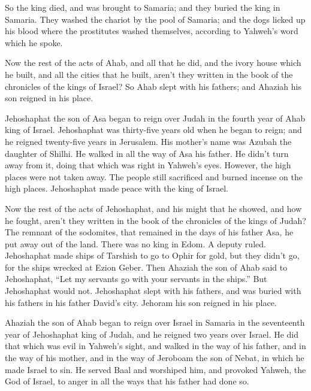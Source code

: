  So the king died, and was brought to Samaria; and they
buried the king in Samaria.  They washed the chariot by
the pool of Samaria; and the dogs licked up his blood where the
prostitutes washed themselves, according to Yahweh's word which he
spoke.

 Now the rest of the acts of Ahab, and all that he did,
and the ivory house which he built, and all the cities that he built,
aren't they written in the book of the chronicles of the kings of
Israel?  So Ahab slept with his fathers; and Ahaziah his
son reigned in his place.

 Jehoshaphat the son of Asa began to reign over Judah in
the fourth year of Ahab king of Israel.  Jehoshaphat was
thirty-five years old when he began to reign; and he reigned twenty-five
years in Jerusalem. His mother's name was Azubah the daughter of Shilhi.
 He walked in all the way of Asa his father. He didn't
turn away from it, doing that which was right in Yahweh's eyes. However,
the high places were not taken away. The people still sacrificed and
burned incense on the high places.  Jehoshaphat made
peace with the king of Israel.

 Now the rest of the acts of Jehoshaphat, and his might
that he showed, and how he fought, aren't they written in the book of
the chronicles of the kings of Judah?  The remnant of the
sodomites, that remained in the days of his father Asa, he put away out
of the land.  There was no king in Edom. A deputy ruled.
 Jehoshaphat made ships of Tarshish to go to Ophir for
gold, but they didn't go, for the ships wrecked at Ezion Geber.
 Then Ahaziah the son of Ahab said to Jehoshaphat, ``Let
my servants go with your servants in the ships.'' But Jehoshaphat would
not.  Jehoshaphat slept with his fathers, and was buried
with his fathers in his father David's city. Jehoram his son reigned in
his place.

 Ahaziah the son of Ahab began to reign over Israel in
Samaria in the seventeenth year of Jehoshaphat king of Judah, and he
reigned two years over Israel.  He did that which was
evil in Yahweh's sight, and walked in the way of his father, and in the
way of his mother, and in the way of Jeroboam the son of Nebat, in which
he made Israel to sin.  He served Baal and worshiped him,
and provoked Yahweh, the God of Israel, to anger in all the ways that
his father had done so.

